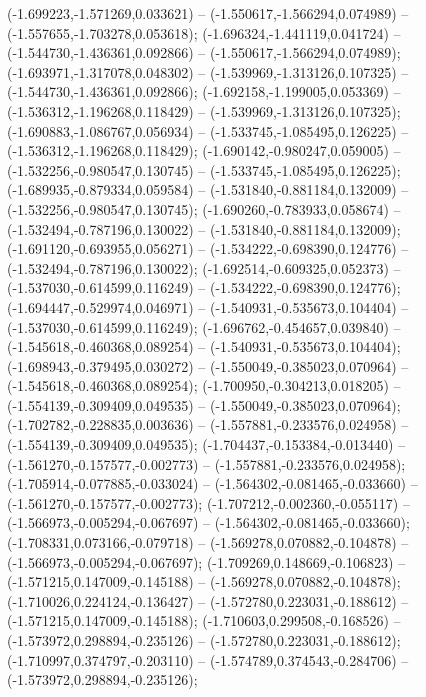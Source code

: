  (-1.699223,-1.571269,0.033621) -- (-1.550617,-1.566294,0.074989) -- (-1.557655,-1.703278,0.053618);
 (-1.696324,-1.441119,0.041724) -- (-1.544730,-1.436361,0.092866) -- (-1.550617,-1.566294,0.074989);
 (-1.693971,-1.317078,0.048302) -- (-1.539969,-1.313126,0.107325) -- (-1.544730,-1.436361,0.092866);
 (-1.692158,-1.199005,0.053369) -- (-1.536312,-1.196268,0.118429) -- (-1.539969,-1.313126,0.107325);
 (-1.690883,-1.086767,0.056934) -- (-1.533745,-1.085495,0.126225) -- (-1.536312,-1.196268,0.118429);
 (-1.690142,-0.980247,0.059005) -- (-1.532256,-0.980547,0.130745) -- (-1.533745,-1.085495,0.126225);
 (-1.689935,-0.879334,0.059584) -- (-1.531840,-0.881184,0.132009) -- (-1.532256,-0.980547,0.130745);
 (-1.690260,-0.783933,0.058674) -- (-1.532494,-0.787196,0.130022) -- (-1.531840,-0.881184,0.132009);
 (-1.691120,-0.693955,0.056271) -- (-1.534222,-0.698390,0.124776) -- (-1.532494,-0.787196,0.130022);
 (-1.692514,-0.609325,0.052373) -- (-1.537030,-0.614599,0.116249) -- (-1.534222,-0.698390,0.124776);
 (-1.694447,-0.529974,0.046971) -- (-1.540931,-0.535673,0.104404) -- (-1.537030,-0.614599,0.116249);
 (-1.696762,-0.454657,0.039840) -- (-1.545618,-0.460368,0.089254) -- (-1.540931,-0.535673,0.104404);
 (-1.698943,-0.379495,0.030272) -- (-1.550049,-0.385023,0.070964) -- (-1.545618,-0.460368,0.089254);
 (-1.700950,-0.304213,0.018205) -- (-1.554139,-0.309409,0.049535) -- (-1.550049,-0.385023,0.070964);
 (-1.702782,-0.228835,0.003636) -- (-1.557881,-0.233576,0.024958) -- (-1.554139,-0.309409,0.049535);
 (-1.704437,-0.153384,-0.013440) -- (-1.561270,-0.157577,-0.002773) -- (-1.557881,-0.233576,0.024958);
 (-1.705914,-0.077885,-0.033024) -- (-1.564302,-0.081465,-0.033660) -- (-1.561270,-0.157577,-0.002773);
 (-1.707212,-0.002360,-0.055117) -- (-1.566973,-0.005294,-0.067697) -- (-1.564302,-0.081465,-0.033660);
 (-1.708331,0.073166,-0.079718) -- (-1.569278,0.070882,-0.104878) -- (-1.566973,-0.005294,-0.067697);
 (-1.709269,0.148669,-0.106823) -- (-1.571215,0.147009,-0.145188) -- (-1.569278,0.070882,-0.104878);
 (-1.710026,0.224124,-0.136427) -- (-1.572780,0.223031,-0.188612) -- (-1.571215,0.147009,-0.145188);
 (-1.710603,0.299508,-0.168526) -- (-1.573972,0.298894,-0.235126) -- (-1.572780,0.223031,-0.188612);
 (-1.710997,0.374797,-0.203110) -- (-1.574789,0.374543,-0.284706) -- (-1.573972,0.298894,-0.235126);
